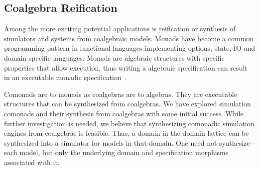 \documentclass[12pt]{article}
\begin{document}
\subsection{Coalgebra Reification}

Among the more exciting potential applications is reification or
synthesis of simulators and systems from coalgebraic models.  Monads
have become a common programming pattern in functional languages
implementing options, state, IO and domain specific languages.  Monads
are algebraic structures with specific properties that allow
execution, thus writing a algebraic specification can result in an
executable monadic
specification~\cite{Kimmell:08:Synthesizing-So,Peck:11:Hardware/Softwa}.

Comonads are to monads as coalgebras are to algebras.  They are
executable structures that can be synthesized from coalgebras.  We
have explored simulation comonads and their synthesis from coalgebras
with some initial success.  While further investigation is needed, we
believe that synthesizing comonadic simulation engines from coalgebras
is feasible.  Thus, a domain in the domain lattice can be synthesized
into a simulator for models in that domain.  One need not synthesize
each model, but only the underlying domain and specification morphisms
associated with it.


\end{document}

